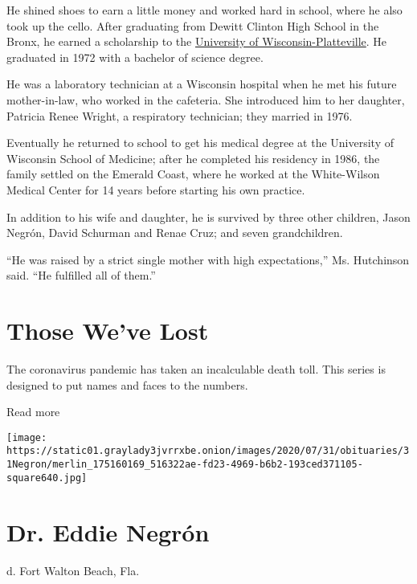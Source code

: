 He shined shoes to earn a little money and worked hard in school, where
he also took up the cello. After graduating from Dewitt Clinton High
School in the Bronx, he earned a scholarship to the
\href{https://www.uwplatt.edu/}{University of Wisconsin-Platteville}. He
graduated in 1972 with a bachelor of science degree.

He was a laboratory technician at a Wisconsin hospital when he met his
future mother-in-law, who worked in the cafeteria. She introduced him to
her daughter, Patricia Renee Wright, a respiratory technician; they
married in 1976.

Eventually he returned to school to get his medical degree at the
University of Wisconsin School of Medicine; after he completed his
residency in 1986, the family settled on the Emerald Coast, where he
worked at the White-Wilson Medical Center for 14 years before starting
his own practice.

In addition to his wife and daughter, he is survived by three other
children, Jason Negrón, David Schurman and Renae Cruz; and seven
grandchildren.

``He was raised by a strict single mother with high expectations,'' Ms.
Hutchinson said. ``He fulfilled all of them.''

\href{https://www.nytimes3xbfgragh.onion/interactive/2020/obituaries/people-died-coronavirus-obituaries.html?action=click\&pgtype=Article\&state=default\&region=BELOW_MAIN_CONTENT\&context=covid_obits_promo}{}

\hypertarget{those-weve-lost}{%
\section{Those We've Lost}\label{those-weve-lost}}

The coronavirus pandemic has taken an incalculable death toll. This
series is designed to put names and faces to the numbers.

Read more

\texttt{[image: https://static01.graylady3jvrrxbe.onion/images/2020/07/31/obituaries/31Negron/merlin\_175160169\_516322ae-fd23-4969-b6b2-193ced371105-square640.jpg]}

\hypertarget{dr-eddie-negruxf3n}{%
\section{Dr. Eddie Negrón}\label{dr-eddie-negruxf3n}}

d. Fort Walton Beach, Fla.

